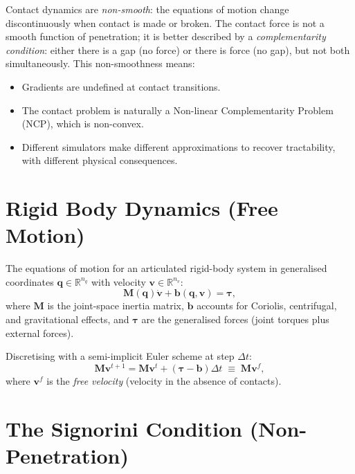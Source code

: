 \documentclass[11pt,twoside]{report}
\theoremstyle{definition}
\theoremstyle{plain}
\theoremstyle{remark}
\newcommand{\R}{\mathbb{R}}
\newcommand{\q}{\bm{q}}
\newcommand{\0}{\bm{0}}
\newcommand{\M}{\bm{M}}
\begin{document}
\begin{warningbox}
Contact dynamics are \emph{non-smooth}: the equations of motion change
discontinuously when contact is made or broken.  The contact force
is not a smooth function of penetration; it is better described by a
\emph{complementarity condition}: either there is a gap (no force)
or there is force (no gap), but not both simultaneously.
This non-smoothness means:
\begin{itemize}
\item Gradients are undefined at contact transitions.
\item The contact problem is naturally a Non-linear Complementarity Problem (NCP), which is non-convex.
\item Different simulators make different approximations to recover tractability, with different physical consequences.
\end{itemize}
\end{warningbox}

\section{Rigid Body Dynamics (Free Motion)}

The equations of motion for an articulated rigid-body system
in generalised coordinates $\q\in\R^{n_{q}}$ with velocity
$\bm{v}\in\R^{n_{v}}$:
\begin{equation}\label{eq:eom-free}
\M(\q)\dot{\bm{v}}+\bm{b}(\q,\bm{v})=\bm{\tau},
\end{equation}
where $\M$ is the joint-space inertia matrix, $\bm{b}$ accounts for
Coriolis, centrifugal, and gravitational effects, and $\bm{\tau}$
are the generalised forces (joint torques plus external forces).

Discretising with a semi-implicit Euler scheme at step $\Delta t$:
\begin{equation}\label{eq:eom-discrete}
\M\bm{v}^{t+1}=\M\bm{v}^{t}+(\bm{\tau}-\bm{b})\Delta t
\;\equiv\;\M\bm{v}^{f},
\end{equation}
where $\bm{v}^{f}$ is the \emph{free velocity} (velocity in the absence of contacts).

\section{The Signorini Condition (Non-Penetration)}
\label{sec:signorini}
\end{document}

